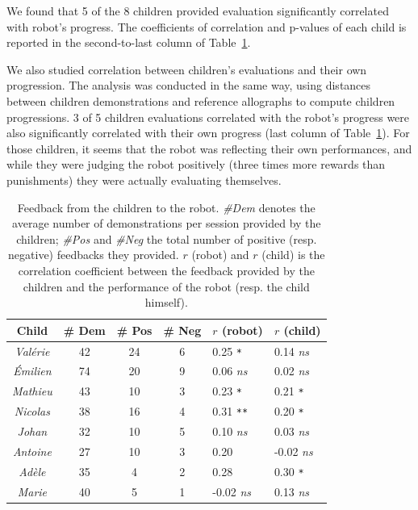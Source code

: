 \documentclass[conference]{IEEEtran}
\begin{document}
We found that 5 of the 8 children provided evaluation significantly correlated with robot's progress. The coefficients of correlation and p-values of each child is reported in the second-to-last column of Table~\ref{table:scores}.

We also studied correlation between children's evaluations and their own
progression. The analysis was conducted in the same way, using distances between children demonstrations and reference allographs to compute children progressions.
3 of 5 children evaluations correlated with the robot's progress were also significantly correlated with their own progress (last column of Table~\ref{table:scores}). For
those children, it seems that the robot was reflecting their own performances, and while they
were judging the robot positively (three times more rewards than punishments)
they were actually evaluating themselves.


\begin{table}
    \centering
    \begin{tabular}{ccccll}
        \toprule
        \bf Child      & \bf \# Dem & \bf \# Pos & \bf \# Neg & $r$ (robot) & $r$ (child) \\ \midrule
        \emph{Val\'erie} & 42           & 24              & 6               & 0.25 \small\tt ** & 0.14 \small\it ns\\ 
        \emph{\'Emilien} & 74           & 20              & 9               & 0.06 \small\it ns & 0.02 \small\it ns\\
        \emph{Mathieu} & 43           & 10              & 3               & 0.23 \small\tt ** & 0.21 \small\tt **\\
        \emph{Nicolas} & 38           & 16              & 4               & 0.31 \small\tt *** & 0.20 \small\tt **\\
        \emph{Johan}   & 32           & 10              & 5               & 0.10 \small\it ns & 0.03 \small\it ns\\
        \emph{Antoine} & 27           & 10              & 3               & 0.20 \small\tt * & -0.02 \small\it ns \\
        \emph{Ad\`ele}   & 35           & 4               & 2               & 0.28 \small\tt * & 0.30 \small\tt ** \\
        \emph{Marie}   & 40           & 5               & 1               & -0.02 \small\it ns & 0.13 \small\it ns\\ \bottomrule
    \end{tabular}
    \caption{\footnotesize Feedback from the children to the robot. \emph{\#Dem}
        denotes the average number of demonstrations per session provided by the children;
        \emph{\#Pos} and \emph{\#Neg} the total number of positive (resp.
        negative) feedbacks they provided. $r$ (robot) and $r$ (child) is the correlation coefficient
        between the feedback provided by the children and the performance of the
        robot (resp. the child himself).}

    \label{table:scores}
\end{table}
\end{document}
